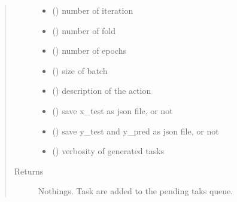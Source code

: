 \documentclass[letterpaper,10pt,english]{sphinxmanual}
\begin{document}
\begin{fulllineitems}
\begin{quote}
\begin{description}
\begin{itemize}
\item {} 
\sphinxAtStartPar
{} () \textendash{} number of iteration

\item {} 
\sphinxAtStartPar
{} () \textendash{} number of fold

\item {} 
\sphinxAtStartPar
{} () \textendash{} number of epochs

\item {} 
\sphinxAtStartPar
{} () \textendash{} size of batch

\item {} 
\sphinxAtStartPar
{} () \textendash{} description of the action

\item {} 
\sphinxAtStartPar
{} () \textendash{} save x\_test as json file, or not

\item {} 
\sphinxAtStartPar
{} () \textendash{} save y\_test and y\_pred  as json file, or not

\item {} 
\sphinxAtStartPar
{} () \textendash{} verbosity of generated tasks

\end{itemize}

\item[{Returns}] \leavevmode
\sphinxAtStartPar
Nothings. Task are added to the pending taks queue.

\end{description}\end{quote}

\end{fulllineitems}

\end{document}

